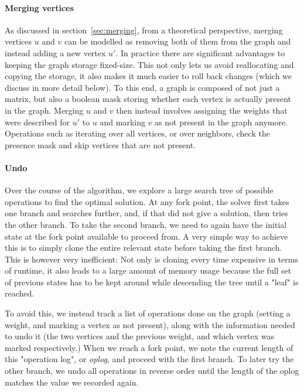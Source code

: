 \documentclass{article}
\theoremstyle{definition}
\begin{document}
\paragraph{Merging vertices} As discussed in section~\ref{sec:merging}, from a theoretical
perspective, merging vertices $u$ and $v$ can be modelled as removing both of them from the graph
and instead adding a new vertex $u'$. In practice there are significant advantages to keeping the
graph storage fixed-size. This not only lets us avoid reallocating and copying the storage, it also
makes it much easier to roll back changes (which we discuss in more detail below). To this end, a
graph is composed of not just a matrix, but also a boolean mask storing whether each vertex is
actually present in the graph. Merging $u$ and $v$ then instead involves assigning the weights that
were described for $u'$ to $u$ and marking $v$ as not present in the graph anymore. Operations such
as iterating over all vertices, or over neighbors, check the presence mask and skip vertices that
are not present.

\paragraph{Undo} Over the course of the algorithm, we explore a large search tree of possible
operations to find the optimal solution. At any fork point, the solver first takes one branch and
searches further, and, if that did not give a solution, then tries the other branch. To take the
second branch, we need to again have the initial state at the fork point available to proceed from.
A very simple way to achieve this is to simply clone the entire relevant state before taking the
first branch. This is however very inefficient: Not only is cloning every time expensive in terms of
runtime, it also leads to a large amount of memory usage because the full set of previous states has
to be kept around while descending the tree until a "leaf" is reached.

To avoid this, we instead track a list of operations done on the graph (setting a weight, and
marking a vertex as not present), along with the information needed to undo it (the two vertices and
the previous weight, and which vertex was marked respectively.) When we reach a fork point, we note
the current length of this "operation log", or \emph{oplog}, and proceed with the first branch. To
later try the other branch, we undo all operations in reverse order until the length of the oplog
matches the value we recorded again.
\end{document}
